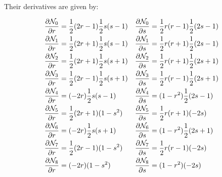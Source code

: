 Their derivatives are given by:
\begin{mdframed}[backgroundcolor=blue!5]
\begin{align}
\frac{\partial {\mathcal{N}}_0}{\partial r}&= \frac{1}{2}(2r-1)  \frac{1}{2}s(s-1) & 
\frac{\partial {\mathcal{N}}_0}{\partial s}&= \frac{1}{2}r(r-1)  \frac{1}{2}(2s-1)\nonumber\\
\frac{\partial {\mathcal{N}}_1}{\partial r}&= \frac{1}{2}(2r+1)  \frac{1}{2}s(s-1) &
\frac{\partial {\mathcal{N}}_1}{\partial s}&= \frac{1}{2}r(r+1)  \frac{1}{2}(2s-1)\nonumber\\
\frac{\partial {\mathcal{N}}_2}{\partial r}&= \frac{1}{2}(2r+1)  \frac{1}{2}s(s+1) &
\frac{\partial {\mathcal{N}}_2}{\partial s}&= \frac{1}{2}r(r+1)  \frac{1}{2}(2s+1)\nonumber\\
\frac{\partial {\mathcal{N}}_3}{\partial r}&= \frac{1}{2}(2r-1)  \frac{1}{2}s(s+1) &
\frac{\partial {\mathcal{N}}_3}{\partial s}&= \frac{1}{2}r(r-1)  \frac{1}{2}(2s+1)\nonumber\\
\frac{\partial {\mathcal{N}}_4}{\partial r}&=       (-2r)  \frac{1}{2}s(s-1) &
\frac{\partial {\mathcal{N}}_4}{\partial s}&=     (1-r^2)  \frac{1}{2}(2s-1)\nonumber\\
\frac{\partial {\mathcal{N}}_5}{\partial r}&= \frac{1}{2}(2r+1)     (1-s^2)&
\frac{\partial {\mathcal{N}}_5}{\partial s}&= \frac{1}{2}r(r+1)        (-2s)\nonumber\\
\frac{\partial {\mathcal{N}}_6}{\partial r}&=       (-2r)  \frac{1}{2}s(s+1)&
\frac{\partial {\mathcal{N}}_6}{\partial s}&=     (1-r^2)  \frac{1}{2}(2s+1)\nonumber\\
\frac{\partial {\mathcal{N}}_7}{\partial r}&= \frac{1}{2}(2r-1)     (1-s^2)&
\frac{\partial {\mathcal{N}}_7}{\partial s}&= \frac{1}{2}r(r-1)        (-2s)\nonumber\\
\frac{\partial {\mathcal{N}}_8}{\partial r}&=       (-2r)     (1-s^2)&
\frac{\partial {\mathcal{N}}_8}{\partial s}&=     (1-r^2)        (-2s)\nonumber
\end{align}
\end{mdframed}

